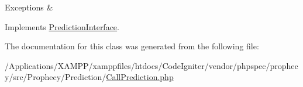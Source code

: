 \begin{DoxyExceptions}{Exceptions}
{\em } & \\
\hline
\end{DoxyExceptions}


Implements \mbox{\hyperlink{interface_prophecy_1_1_prediction_1_1_prediction_interface_a8753cea9fc952add136830abab587633}{Prediction\+Interface}}.



The documentation for this class was generated from the following file\+:\begin{DoxyCompactItemize}
\item 
/\+Applications/\+X\+A\+M\+P\+P/xamppfiles/htdocs/\+Code\+Igniter/vendor/phpspec/prophecy/src/\+Prophecy/\+Prediction/\mbox{\hyperlink{_call_prediction_8php}{Call\+Prediction.\+php}}\end{DoxyCompactItemize}
